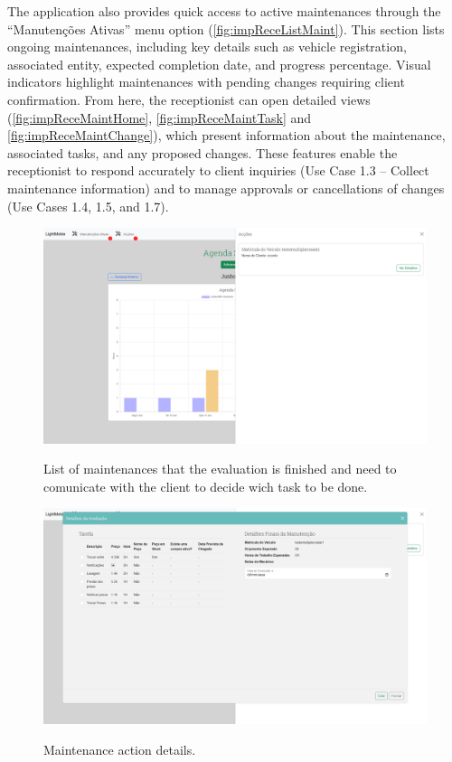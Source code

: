 The application also provides quick access to active maintenances through the “Manutenções Ativas” menu option (\ref{fig:impReceListMaint}). This section lists ongoing maintenances, including key details such as vehicle registration, associated entity, expected completion date, and progress percentage. Visual indicators highlight maintenances with pending changes requiring client confirmation. From here, the receptionist can open detailed views (\ref{fig:impReceMaintHome}, \ref{fig:impReceMaintTask} and \ref{fig:impReceMaintChange}), which present information about the maintenance, associated tasks, and any proposed changes. These features enable the receptionist to respond accurately to client inquiries (Use Case 1.3 – Collect maintenance information) and to manage approvals or cancellations of changes (Use Cases 1.4, 1.5, and 1.7).


\begin{figure}[h]
  \caption{List of maintenances that the evaluation is finished and need to comunicate with the client to decide wich task to be done.}
  \centering
  \includegraphics[width=\textwidth]{figs/Implementation/rececionist/action_list}
  \label{fig:impReceListAction}
\end{figure}

\begin{figure}[h]
  \caption{Maintenance action details.}
  \centering
  \includegraphics[width=\textwidth]{figs/Implementation/rececionist/action_details}
  \label{fig:impReceActionHome}
\end{figure}

